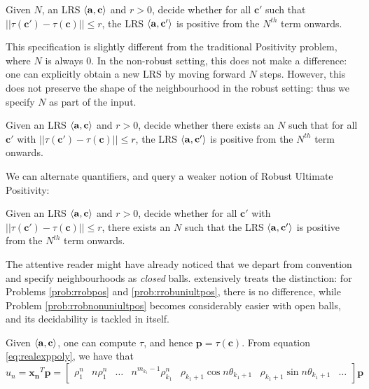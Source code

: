 \begin{problem}
\label{prob:rrobpos}
Given $N$, an LRS $\langle\mathbf{a}, \mathbf{c}\rangle$ and $r > 0$, decide whether for all $\mathbf{c'}$ such that $||\tau(\mathbf{c'}) - \tau(\mathbf{c})|| \le r$, the LRS $\langle\mathbf{a}, \mathbf{c'}\rangle$ is positive from the $N^{th}$ term onwards.
\end{problem}

This specification is slightly different from the traditional Positivity problem, where $N$ is always $0$. In the non-robust setting, this does not make a difference: one can explicitly obtain a new LRS by moving forward $N$ steps. However, this does not preserve the shape of the neighbourhood in the robust setting: thus we specify $N$ as part of the input.

\begin{problem}
\label{prob:rrobuniultpos}
Given an LRS $\langle\mathbf{a}, \mathbf{c}\rangle$ and $r > 0$, decide whether there exists an $N$ such that for all $\mathbf{c'}$ with $||\tau(\mathbf{c'}) - \tau(\mathbf{c})|| \le r$, the LRS $\langle\mathbf{a}, \mathbf{c'}\rangle$ is positive from the $N^{th}$ term onwards.
\end{problem}

We can alternate quantifiers, and query a weaker notion of Robust Ultimate Positivity:
\begin{problem}
\label{prob:rrobnonuniultpos}
Given an LRS $\langle\mathbf{a}, \mathbf{c}\rangle$ and $r > 0$, decide whether for all $\mathbf{c'}$ with $||\tau(\mathbf{c'}) - \tau(\mathbf{c})|| \le r$, there exists an $N$ such that the LRS $\langle\mathbf{a}, \mathbf{c'}\rangle$ is positive from the $N^{th}$ term onwards.
\end{problem}

The attentive reader might have already noticed that we depart from convention and specify neighbourhoods as \textit{closed} balls. \cite{originalarxiv} extensively treats the distinction: for Problems \ref{prob:rrobpos} and \ref{prob:rrobuniultpos}, there is no difference, while Problem \ref{prob:rrobnonuniultpos} becomes considerably easier with open balls, and its decidability is tackled in \cite{originalarxiv} itself.

Given $\langle\mathbf{a}, \mathbf{c}\rangle$, one can compute $\tau$, and hence $\mathbf{p} = \tau(\mathbf{c})$. From equation \ref{eq:realexppoly}, we have that 
\begin{equation}
\label{eq:innerprod}
u_n = \mathbf{x_n}^T\mathbf{p} = 
\begin{bmatrix}
\rho_1^n & n \rho_1^n & \dots & n^{m_{k_1}-1}\rho_{k_1}^n & \rho_{k_1+1}\cos n\theta_{k_1+1} & \rho_{k_1+1}\sin n\theta_{k_1+1} & \dots
\end{bmatrix}\mathbf{p}
\end{equation}

